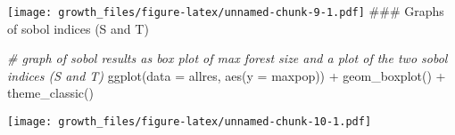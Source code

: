 \documentclass[
]{article}
\newenvironment{Shaded}{\begin{snugshade}}{\end{snugshade}}
\newcommand{\AttributeTok}[1]{\textcolor[rgb]{0.77,0.63,0.00}{#1}}
\newcommand{\CommentTok}[1]{\textcolor[rgb]{0.56,0.35,0.01}{\textit{#1}}}
\newcommand{\FunctionTok}[1]{\textcolor[rgb]{0.00,0.00,0.00}{#1}}
\newcommand{\NormalTok}[1]{#1}
\newcommand{\OtherTok}[1]{\textcolor[rgb]{0.56,0.35,0.01}{#1}}
\newcommand{\SpecialCharTok}[1]{\textcolor[rgb]{0.00,0.00,0.00}{#1}}
\begin{document}
\texttt{[image: growth\_files/figure-latex/unnamed-chunk-9-1.pdf]} \#\#\#
Graphs of sobol indices (S and T)

\begin{Shaded}
\begin{Highlighting}[]
\CommentTok{\# graph of sobol results as box plot of max forest size and a plot of the two sobol indices (S and T)}
\FunctionTok{ggplot}\NormalTok{(}\AttributeTok{data =}\NormalTok{ allres,}
       \FunctionTok{aes}\NormalTok{(}\AttributeTok{y =}\NormalTok{ maxpop)) }\SpecialCharTok{+} 
  \FunctionTok{geom\_boxplot}\NormalTok{() }\SpecialCharTok{+} 
  \FunctionTok{theme\_classic}\NormalTok{() }
\end{Highlighting}
\end{Shaded}

\texttt{[image: growth\_files/figure-latex/unnamed-chunk-10-1.pdf]}

\begin{Shaded}
\end{Shaded}
\end{document}

